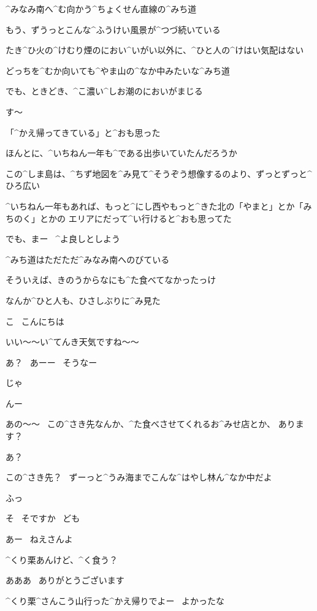 \page[142]
\Alpha ^{みなみ}{南}へ^{む}{向}かう^{ちょくせん}{直線}の^{みち}{道}

\Alpha もう、ずうっとこんな^{ふうけい}{風景}が^{つづ}{続}いている

\Alpha たき^{ひ}{火}の^{けむり}{煙}のにおい^{いがい}{以外}に、^{ひと}{人}の^{けはい}{気配}はない

\page
\Alpha どっちを^{むか}{向}いても^{やま}{山}の^{なか}{中}みたいな^{みち}{道}

\Alpha でも、ときどき、^{こ}{濃}い^{しお}{潮}のにおいがまじる

\Alpha す〜

\Alpha 「^{かえ}{帰}ってきている」と^{おも}{思}った

\Alpha ほんとに、^{いちねん}{一年}も^{である}{出歩}いていたんだろうか

\page
\Alpha この^{しま}{島}は、^{ちず}{地図}を^{み}{見}て^{そうぞう}{想像}するのより、ずっとずっと^{ひろ}{広}い

\Alpha ^{いちねん}{一年}もあれば、もっと^{にし}{西}やもっと^{きた}{北}の「やまと」とか「みちのく」とかの
エリアにだって^{い}{行}けると^{おも}{思}ってた

\Alpha でも、まー
\ ^{よ}{良}しとしよう

\page
\Alpha ^{みち}{道}はただただ^{みなみ}{南}へのびている

\page
\Alpha そういえば、きのうからなにも^{た}{食}べてなかったっけ

\Alpha なんか^{ひと}{人}も、ひさしぶりに^{み}{見}た

\page
\Alpha こ
\ こんにちは

\Alpha いい〜〜い^{てんき}{天気}ですね〜〜

\Person あ？
\ あーー
\ そうなー

\Alpha じゃ

\Person んー

\Alpha あの〜〜
\ この^{さき}{先}なんか、^{た}{食}べさせてくれるお^{みせ}{店}とか、
あります？

\Person あ？

\page
\Person この^{さき}{先}？
\ ずーっと^{うみ}{海}までこんな^{はやし}{林}ん^{なか}{中}だよ

\Alpha ふっ

\Alpha そ
\ そですか
\ ども

\Person あー
\ ねえさんよ

\Person ^{くり}{栗}あんけど、^{く}{食}う？

\Alpha あああ
\ ありがとうございます

\page
\Person ^{くり}{栗}^{さんこう}{山行}った^{かえ}{帰}りでよー
\ よかったな

